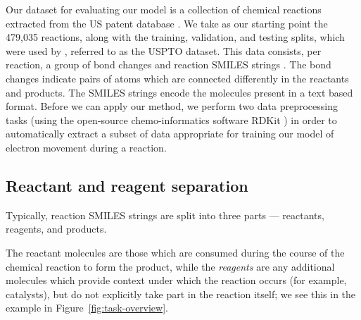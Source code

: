 

Our dataset for evaluating our model is a collection of chemical reactions extracted from the US patent database \citep{Lowe2017}.
We take as our starting point the 479,035 reactions, along with the training, validation, and testing splits, 
which were used by \citet{jin2017predicting}, referred to as the USPTO dataset.
This data consists, per reaction, a group of bond changes and reaction SMILES strings \citep{weininger1988smiles}.
The bond changes indicate pairs of atoms which are connected differently in the reactants and products.
The SMILES strings encode the molecules present in a text based format.
Before we can apply our method, we perform two data preprocessing tasks 
(using the open-source chemo-informatics software RDKit \citep{rdkit}) 
in order to automatically
extract a subset of data appropriate for training our model of electron movement during a reaction. 

\subsection{Reactant and reagent separation}

Typically, reaction SMILES strings are split into three parts --- reactants, reagents, and products.

The reactant molecules are those which are consumed during the course of the chemical reaction to form the  product, 
while the {\em reagents} are any additional molecules which provide context under which the reaction occurs (for example, catalysts),
but do not explicitly take part in the reaction itself; we see this in the example in Figure~\ref{fig:task-overview}.

